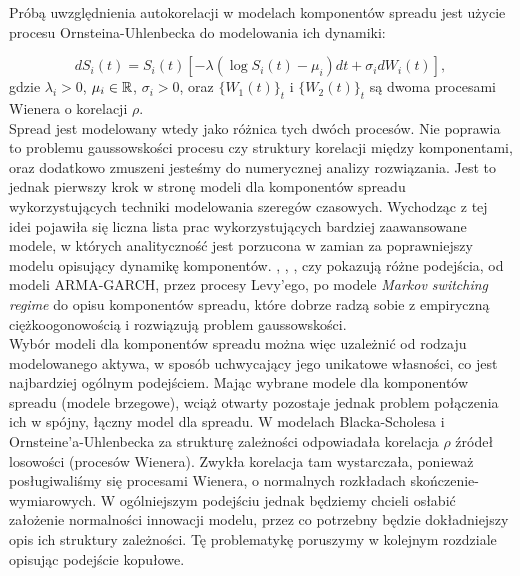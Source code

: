 Próbą uwzględnienia autokorelacji w modelach komponentów spreadu jest użycie procesu Ornsteina-Uhlenbecka do modelowania ich dynamiki:

$$ dS_i(t) =S_i(t)[-\lambda (\log S_i(t) - \mu_i)dt + \sigma_i dW_i(t)],$$
gdzie $\lambda_i>0$,  $\mu_i \in \mathbb{R}$, $\sigma_i >0$, oraz $\{W_1(t)\}_t$ i $\{W_2(t)\}_t$ są dwoma procesami Wienera o korelacji $\rho$.\\

Spread jest modelowany wtedy jako różnica tych dwóch procesów. Nie poprawia to problemu gaussowskości procesu czy struktury korelacji między komponentami, oraz dodatkowo zmuszeni jesteśmy do numerycznej analizy rozwiązania. Jest to jednak pierwszy krok w stronę modeli dla komponentów spreadu wykorzystujących techniki modelowania szeregów czasowych. Wychodząc z tej idei pojawiła się liczna lista prac wykorzystujących bardziej zaawansowane modele, w których analityczność jest porzucona w zamian za poprawniejszy modelu opisujący dynamikę komponentów. \cite{Herath_Copula_Crack_Spread}, \cite{Boubaker_Markov_Copula}, \cite{Espen_Crack_Spread_Copula}, czy \cite{Bernard_Pricing_Multivariate_Options_with_copulae} pokazują różne podejścia, od modeli ARMA-GARCH, przez procesy Levy'ego, po modele \emph{Markov switching regime} do opisu komponentów spreadu, które dobrze radzą sobie z empiryczną ciężkoogonowością i rozwiązują problem gaussowskości.\\

Wybór modeli dla komponentów spreadu można więc uzależnić od rodzaju modelowanego aktywa, w sposób uchwycający jego unikatowe własności, co jest najbardziej ogólnym podejściem. Mając wybrane modele dla komponentów spreadu (modele brzegowe), wciąż otwarty pozostaje jednak problem połączenia ich w spójny, łączny model dla spreadu. W modelach Blacka-Scholesa i Ornsteine'a-Uhlenbecka za strukturę zależności odpowiadała korelacja $\rho$ źródeł losowości (procesów Wienera). Zwykła korelacja tam wystarczała, ponieważ posługiwaliśmy się procesami Wienera, o normalnych rozkładach skończenie-wymiarowych. W ogólniejszym podejściu jednak będziemy chcieli osłabić założenie normalności innowacji modelu, przez co potrzebny będzie dokładniejszy opis ich struktury zależności. Tę problematykę poruszymy w kolejnym rozdziale opisując podejście kopułowe.